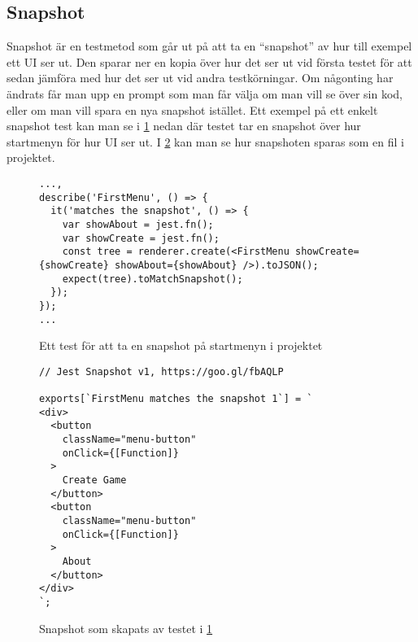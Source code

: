 \subsection{Snapshot}
Snapshot är en testmetod som går ut på att ta en ``snapshot'' av hur till exempel ett UI ser ut. Den sparar ner en kopia över hur det ser ut vid första testet för att sedan jämföra med hur det ser ut vid andra testkörningar. Om någonting har ändrats får man upp en prompt som man får välja om man vill se över sin kod, eller om man vill spara en nya snapshot istället. Ett exempel på ett enkelt snapshot test kan man se i \ref{fig:snapshot-test} nedan där testet tar en snapshot över hur startmenyn för hur UI ser ut. I \ref{fig:snapshot-shot} kan man se hur snapshoten sparas som en fil i projektet.

\lstset{language=JavaScript}
\begin{figure}[h]
  \center
  \begin{minipage}[c]{5cm}
    \begin{lstlisting}
...,
describe('FirstMenu', () => {
  it('matches the snapshot', () => {
    var showAbout = jest.fn();
    var showCreate = jest.fn();
    const tree = renderer.create(<FirstMenu showCreate={showCreate} showAbout={showAbout} />).toJSON();
    expect(tree).toMatchSnapshot();
  });
});
...
    \end{lstlisting}
  \end{minipage}

  \caption{Ett test för att ta en snapshot på startmenyn i projektet}
  \label{fig:snapshot-test}
\end{figure}


\lstset{language=Java}
\begin{figure}[h]
  \center
  \begin{minipage}[c]{5cm}
    \begin{lstlisting}
// Jest Snapshot v1, https://goo.gl/fbAQLP

exports[`FirstMenu matches the snapshot 1`] = `
<div>
  <button
    className="menu-button"
    onClick={[Function]}
  >
    Create Game
  </button>
  <button
    className="menu-button"
    onClick={[Function]}
  >
    About
  </button>
</div>
`;

    \end{lstlisting}
  \end{minipage}

  \caption{Snapshot som skapats av testet i \ref{fig:snapshot-test}}
  \label{fig:snapshot-shot}
\end{figure}
\pagebreak

